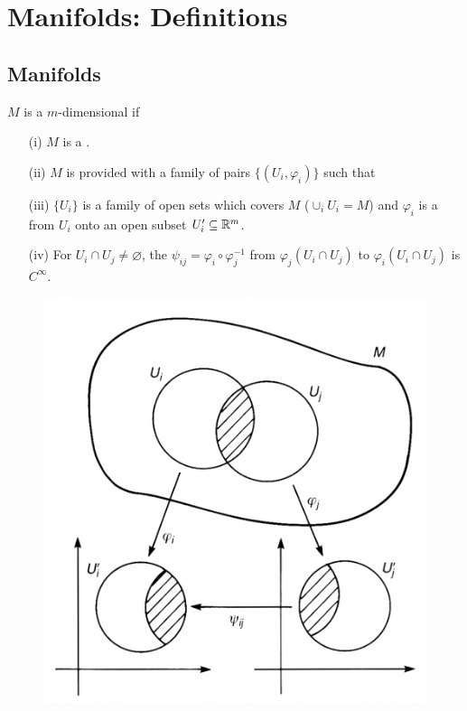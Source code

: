 \documentclass[a4paper, 10pt]{article}
\begin{document}
\setcounter{section}{3}
\section{Manifolds: Definitions}

\setcounter{subsection}{2}
\subsection{Manifolds}

\setcounter{theorem}{16}
\begin{definition}
    $M$ is a $m$-dimensional  if
    \begin{itemize}
        \item[(i)] $M$ is a .
        \item[(ii)] $M$ is provided with a family of pairs $\{ (U_{i}, \varphi_{i}) \}$ such that
        \item[(iii)] $\{ U_{i} \}$ is a family of open sets which covers $M$ ($\displaystyle{\cup_{i} U_{i} = M}$) and $\varphi_{i}$ is a  from $U_{i}$ onto an open subset $U_{i}' \subseteq \mathbb{R}^{m}$.
        \item[(iv)] For $U_{i} \cap U_{j} \neq \varnothing$, the  $\psi_{ij} = \varphi_{i} \circ \varphi_{j}^{-1}$ from $\varphi_{j}(U_{i} \cap U_{j})$ to $\varphi_{i}(U_{i} \cap U_{j})$ is $C^{\infty}$.
    \end{itemize}
    \begin{figure}[htbp!]
        \centering
        \includegraphics[width=0.4\linewidth]{../images/lecture05/5_01.png}
    \end{figure}
\end{definition}
\end{document}
